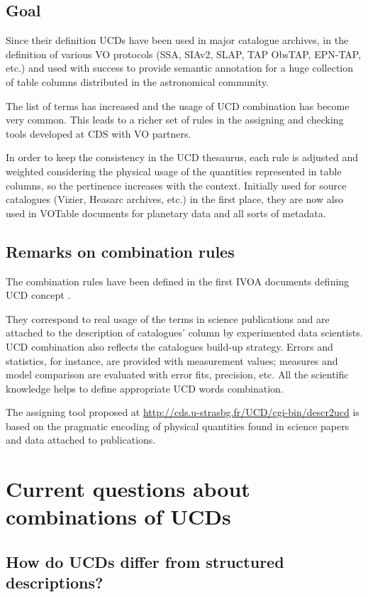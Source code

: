 \documentclass[11pt,a4paper]{ivoa}
\begin{document}
\subsection{Goal}
Since their definition UCDs have been used in major catalogue archives, in the definition of various
VO protocols (SSA, SIAv2, SLAP, TAP ObsTAP, EPN-TAP, etc.) and used with success to provide semantic
annotation for a huge collection of table columns distributed in the astronomical community.

The list of terms has increased and the usage of UCD combination has become very common. This leads
to a richer set of rules in the assigning and checking tools developed at CDS with VO partners.

In order to keep the consistency in the UCD thesaurus, each rule is adjusted and weighted considering 
the physical usage of the quantities represented in table columns, so the pertinence increases with 
the context. Initially used for source catalogues (Vizier, Heasarc archives, etc.) in the first place, 
they are now also used in VOTable documents for planetary data \citep{wd:epntap,erard-vespa} and all sorts of metadata.

\subsection{Remarks on combination rules}
The combination rules have been defined in the first IVOA documents defining UCD concept
\citep{std:UCD}.

They correspond to real usage of the terms in science publications and are attached to the description 
of catalogues’ column by experimented data scientists. UCD combination also reflects the catalogues 
build-up strategy. Errors and statistics, for instance, are provided with measurement values; measures 
and model comparison are evaluated with error fits, precision, etc. All the scientific knowledge helps 
to define appropriate UCD words combination.

The assigning tool proposed at \url{http://cds.u-strasbg.fr/UCD/cgi-bin/descr2ucd} is based on the
pragmatic encoding of physical quantities found in science papers and data attached to publications.

\appendix
\section{Current questions about combinations of UCDs}
\subsection{How do UCDs differ from structured descriptions?}
\end{document}
